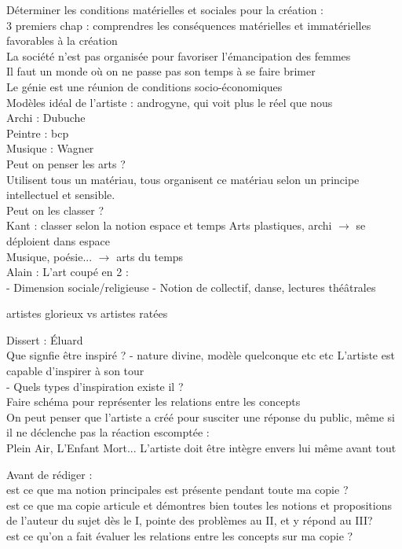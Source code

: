 \documentclass[a4paper,twocolumn,landscape]{article}
\begin{document}
Déterminer les conditions matérielles et sociales pour la création : \\
3 premiers chap : comprendres les conséquences matérielles et immatérielles favorables
à la création\\
La société n'est pas organisée pour favoriser l'émancipation des femmes\\
Il faut un monde où on ne passe pas son temps à se faire brimer\\
Le génie est une réunion de conditions socio-économiques \\
Modèles idéal de l'artiste : androgyne, qui voit plus le réel 
que nous \\

\noindent
Archi : Dubuche\\
Peintre : bcp\\
Musique : Wagner\\

\noindent
Peut on penser les arts ? \\
Utilisent tous un matériau, tous organisent ce matériau selon un principe
intellectuel et sensible.\\

\noindent
Peut on les classer ? \\
Kant : classer selon la notion espace et temps
Arts plastiques, archi \(\to\) se déploient dans espace\\
Musique, poésie... \(\to\) arts du temps \\

\noindent
Alain : L'art coupé en 2 :\\
- Dimension sociale/religieuse 
- Notion de collectif, danse, lectures théâtrales

artistes glorieux vs artistes ratées

Dissert : Éluard \\
Que signfie être inspiré ? 
- nature divine, modèle quelconque etc etc
L'artiste est capable d'inspirer à son tour \\
- Quels types d'inspiration existe il ? \\

\noindent
Faire schéma pour représenter les relations entre les concepts\\
On peut penser que l'artiste a créé pour susciter une réponse 
du public, même si il ne déclenche pas la réaction escomptée :\\
Plein Air, L'Enfant Mort...
L'artiste doit être intègre envers lui même avant tout 

\noindent
Avant de rédiger : \\
est ce que ma notion principales est présente pendant toute ma copie ? \\
est ce que ma copie articule et démontres bien toutes les notions et propositions de l'auteur du sujet dès le I,
pointe des problèmes au II, et y répond au III?\\
est ce qu'on a fait évaluer les relations entre les concepts sur ma copie ? \\
\end{document}
